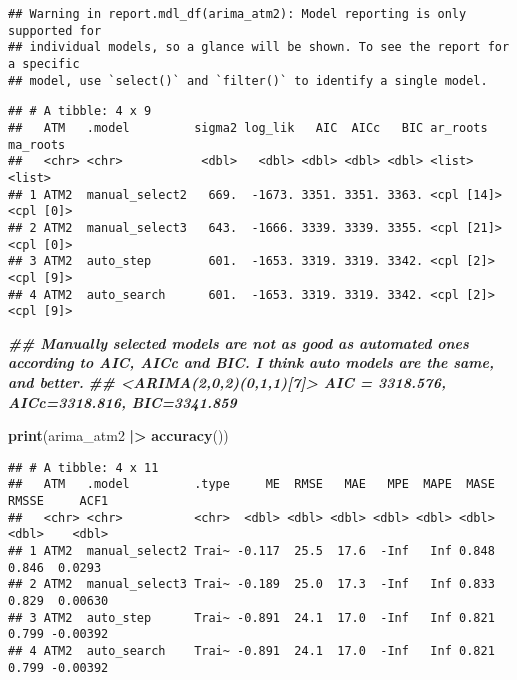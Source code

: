 \documentclass[
]{article}
\newenvironment{Shaded}{\begin{snugshade}}{\end{snugshade}}
\newcommand{\DocumentationTok}[1]{\textcolor[rgb]{0.56,0.35,0.01}{\textbf{\textit{#1}}}}
\newcommand{\FunctionTok}[1]{\textcolor[rgb]{0.13,0.29,0.53}{\textbf{#1}}}
\newcommand{\NormalTok}[1]{#1}
\newcommand{\SpecialCharTok}[1]{\textcolor[rgb]{0.81,0.36,0.00}{\textbf{#1}}}
\begin{document}
\begin{verbatim}
## Warning in report.mdl_df(arima_atm2): Model reporting is only supported for
## individual models, so a glance will be shown. To see the report for a specific
## model, use `select()` and `filter()` to identify a single model.
\end{verbatim}

\begin{verbatim}
## # A tibble: 4 x 9
##   ATM   .model         sigma2 log_lik   AIC  AICc   BIC ar_roots   ma_roots 
##   <chr> <chr>           <dbl>   <dbl> <dbl> <dbl> <dbl> <list>     <list>   
## 1 ATM2  manual_select2   669.  -1673. 3351. 3351. 3363. <cpl [14]> <cpl [0]>
## 2 ATM2  manual_select3   643.  -1666. 3339. 3339. 3355. <cpl [21]> <cpl [0]>
## 3 ATM2  auto_step        601.  -1653. 3319. 3319. 3342. <cpl [2]>  <cpl [9]>
## 4 ATM2  auto_search      601.  -1653. 3319. 3319. 3342. <cpl [2]>  <cpl [9]>
\end{verbatim}

\begin{Shaded}
\begin{Highlighting}[]
\DocumentationTok{\#\# Manually selected models are not as good as automated ones according to AIC, AICc and BIC. I think auto models are the same, and better.}
\DocumentationTok{\#\# \textless{}ARIMA(2,0,2)(0,1,1)[7]\textgreater{} AIC = 3318.576, AICc=3318.816, BIC=3341.859}

\FunctionTok{print}\NormalTok{(arima\_atm2 }\SpecialCharTok{|\textgreater{}} \FunctionTok{accuracy}\NormalTok{())}
\end{Highlighting}
\end{Shaded}

\begin{verbatim}
## # A tibble: 4 x 11
##   ATM   .model         .type     ME  RMSE   MAE   MPE  MAPE  MASE RMSSE     ACF1
##   <chr> <chr>          <chr>  <dbl> <dbl> <dbl> <dbl> <dbl> <dbl> <dbl>    <dbl>
## 1 ATM2  manual_select2 Trai~ -0.117  25.5  17.6  -Inf   Inf 0.848 0.846  0.0293 
## 2 ATM2  manual_select3 Trai~ -0.189  25.0  17.3  -Inf   Inf 0.833 0.829  0.00630
## 3 ATM2  auto_step      Trai~ -0.891  24.1  17.0  -Inf   Inf 0.821 0.799 -0.00392
## 4 ATM2  auto_search    Trai~ -0.891  24.1  17.0  -Inf   Inf 0.821 0.799 -0.00392
\end{verbatim}
\end{document}
